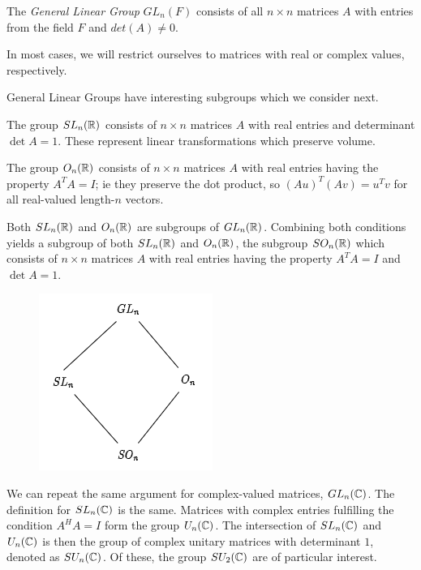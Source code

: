 \begin{definition}
The \emph{General Linear Group} $GL_n(F)$ consists of all $n \times n$ matrices $A$ with entries from the field $F$ and $det(A) \neq 0$.
\end{definition}

In most cases, we will restrict ourselves to matrices with real or complex values, respectively. 

General Linear Groups have interesting subgroups which we consider next.

\begin{definition}
The group $SL_n(\mathbb{R})$ consists of $n \times n$ matrices $A$ with real entries and determinant $\det A = 1$. These represent linear transformations which preserve volume.

The group $O_n(\mathbb{R})$ consists of $n \times n$ matrices $A$ with real entries having the property $A^T A = I$; ie they preserve the dot product, so $(Au)^T(Av) = u^T v$ for all real-valued length-$n$ vectors.
\end{definition}

Both $SL_n(\mathbb{R})$ and $O_n(\mathbb{R})$ are subgroups of $GL_n(\mathbb{R})$. Combining both conditions yields a subgroup of both $SL_n(\mathbb{R})$ and $O_n(\mathbb{R})$, the subgroup $SO_n(\mathbb{R})$ which consists of $n \times n$ matrices $A$ with real entries having the property $A^T A = I$ and $\det A = 1$.


\begin{figure}[H]
\centering
\includegraphics[scale=0.65]{images/2023-07-11_matrices.png}
\end{figure}

We can repeat the same argument for complex-valued matrices, $GL_n(\mathbb{C})$. The definition for $SL_n(\mathbb{C})$ is the same. Matrices with complex entries fulfilling the condition $A^H A = I$ form the group $U_n(\mathbb{C})$. The intersection of $SL_n(\mathbb{C})$ and $U_n(\mathbb{C})$ is then the group of complex unitary matrices with determinant $1$, denoted as $SU_n(\mathbb{C})$. Of these, the group $SU_2(\mathbb{C})$ are of particular interest.


